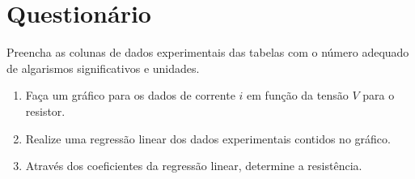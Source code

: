 \cleardoublepage


\vspace{15mm}

\begin{fullwidth}
\noindent{}
\vspace{5mm}

\noindent{}

\noindent{}

\noindent{}

\noindent{}

\noindent{}
\end{fullwidth}

\vspace{5mm}

\section{Questionário}

\begin{question}[type={exam}]{2}
Preencha as colunas de dados experimentais das tabelas com o número adequado de algarismos significativos e unidades.
\end{question}

\begin{question}[type={exam}]{3}
\begin{enumerate}[label=\roman*.]
\item Faça um gráfico para os dados de corrente $i$ em função da tensão $V$ para o resistor.
\item Realize uma regressão linear dos dados experimentais contidos no gráfico.
\item Através dos coeficientes da regressão linear, determine a resistência.
\end{enumerate}
\end{question}

